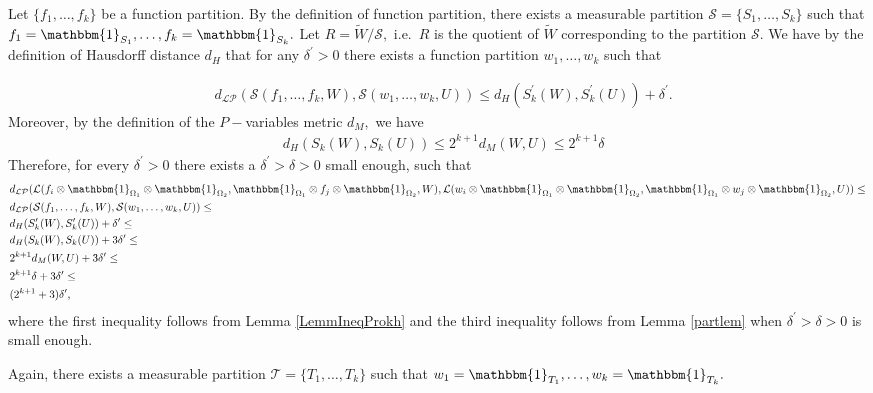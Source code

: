 \documentclass[11pt]{article}
\newcommand{\cS}{{\mathcal S}}  %
\newcommand{\cT}{{\mathcal T}}  %
\begin{document}
Let $\{f_1,\ldots,f_k\}$ be a function partition. By the definition of function partition, there exists a measurable partition $\cS=\{S_1,\ldots,S_k\}$ such that $f_1=\mathbbm{1}_{S_1}, \ldots, f_k=\mathbbm{1}_{S_k}.$ Let $R=\widetilde W/\cS,$ i.e.\ $R$ is the quotient of  $\widetilde W$ corresponding to the partition $\cS.$ We have by the definition of Hausdorff distance $d_H$ that for any $\delta^{\prime}>0$ there exists a function partition $w_1,\ldots,w_k$ such that 

$$
\begin{aligned}
&d_{\mathcal{LP}}(\mathcal{S}(f_1,\ldots,f_k,W),\mathcal{S}(w_1,\ldots,w_k,U))\leq d_H(S^{\prime}_k(W),S^{\prime}_k(U))+\delta^{\prime}.
\end{aligned}
$$
Moreover, by the definition of the $P-$variables metric $d_M,$ we have 
$$
\begin{aligned}
& d_H(S_k(W),S_k(U))\leq  2^{k+1}d_M(W,U) \leq 2^{k+1}\delta%
\end{aligned}
$$
Therefore, for every $\delta^{\prime}>0$ there exists a $\delta^{\prime}>\delta >0$ small enough, such that 
$$
\begin{aligned}\label{ineq1}
&d_{\mathcal{LP}}(\mathcal{L}(f_i \otimes\mathbbm{1}_{\Omega_1} \otimes \mathbbm{1}_{\Omega_2},\mathbbm{1}_{\Omega_1}\otimes f_j \otimes\mathbbm{1}_{\Omega_2},W),\mathcal{L}(w_i \otimes\mathbbm{1}_{\Omega_1} \otimes \mathbbm{1}_{\Omega_2},\mathbbm{1}_{\Omega_1}\otimes w_j \otimes\mathbbm{1}_{\Omega_2},U))\leq\\
&d_{\mathcal{LP}}(\mathcal{S}(f_1,\ldots,f_k,W),\mathcal{S}(w_1,\ldots,w_k,U))\leq \\
&d_H(S^{\prime}_k(W),S^{\prime}_k(U))+\delta^{\prime} \leq \\
& d_H(S_k(W),S_k(U))+3\delta^{\prime}\leq  \\
& 2^{k+1}d_M(W,U)+3\delta^{\prime}\leq \\
&2^{k+1}\delta+3\delta^{\prime}\leq\\
& (2^{k+1}+3)\delta^{\prime},
\end{aligned}
$$
where the first inequality follows from Lemma \ref{LemmIneqProkh} and the third inequality follows from Lemma \ref{partlem} when $\delta^{\prime}>\delta >0$ is small enough.

Again, there exists a measurable partition $\cT=\{T_1,\ldots,T_k\}$ such that $w_1=\mathbbm{1}_{T_1},\ldots, w_k=\mathbbm{1}_{T_k}.$
\end{document}
